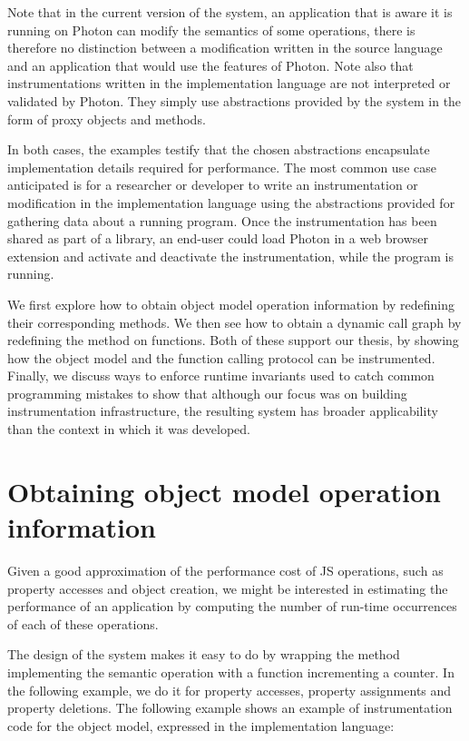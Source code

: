 Note that in the current version of the system, an application that is aware it
is running on Photon can modify the semantics of some operations, there is
therefore no distinction between a modification written in the source language
and an application that would use the features of Photon. Note also that
instrumentations written in the implementation language are not interpreted or
validated by Photon. They simply use abstractions provided by the system in
the form of proxy objects and methods.

In both cases, the examples testify that the chosen abstractions encapsulate
implementation details required for performance. The most common use case
anticipated is for a researcher or developer to write an instrumentation or
modification in the implementation language using the abstractions provided for
gathering data about a running program. Once the instrumentation has been
shared as part of a library, an end-user could load Photon in a web browser
extension and activate and deactivate the instrumentation, while the program is
running.

We first explore how to obtain object model operation information by redefining
their corresponding methods.  We then see how to obtain a dynamic call graph by
redefining the  method on functions. Both of these support our thesis,
by showing how the object model and the function calling protocol can be
instrumented. Finally, we discuss ways to enforce runtime invariants used to
catch common programming mistakes to show that although our focus was on
building instrumentation infrastructure, the resulting system has broader
applicability than the context in which it was developed.

\section{Obtaining object model operation information}
\label{sec:ObjectModelInstrumentation}

Given a good approximation of the performance cost of JS operations, such as
property accesses and object creation, we might be interested in estimating the
performance of an application by computing the number of run-time occurrences of
each of these operations.

The design of the system makes it easy to do by wrapping the method
implementing the semantic operation with a function incrementing a counter.  In
the following example, we do it for property accesses, property assignments
and property deletions. The following example shows an example of
instrumentation code for the object model, expressed in the
implementation language:


